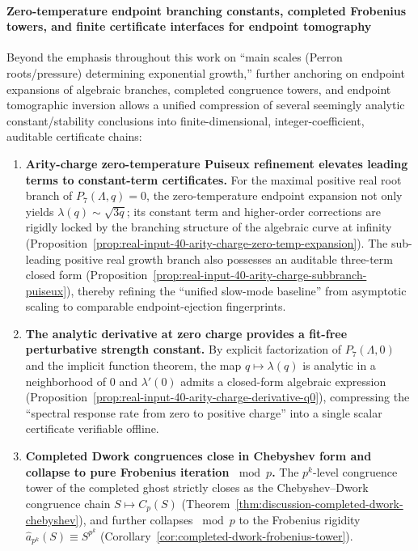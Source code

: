 \paragraph{Zero-temperature endpoint branching constants, completed Frobenius towers, and finite certificate interfaces for endpoint tomography}
Beyond the emphasis throughout this work on ``main scales (Perron roots/pressure) determining exponential growth,'' further anchoring on endpoint expansions of algebraic branches, completed congruence towers, and endpoint tomographic inversion allows a unified compression of several seemingly analytic constant/stability conclusions into finite-dimensional, integer-coefficient, auditable certificate chains:
\begin{enumerate}
  \item \textbf{Arity-charge zero-temperature Puiseux refinement elevates leading terms to constant-term certificates.}
  For the maximal positive real root branch of \(P_7(\Lambda,q)=0\), the zero-temperature endpoint expansion not only yields \(\lambda(q)\sim \sqrt{3q}\); its constant term and higher-order corrections are rigidly locked by the branching structure of the algebraic curve at infinity (Proposition~\ref{prop:real-input-40-arity-charge-zero-temp-expansion}).
  The sub-leading positive real growth branch also possesses an auditable three-term closed form (Proposition~\ref{prop:real-input-40-arity-charge-subbranch-puiseux}), thereby refining the ``unified slow-mode baseline'' from asymptotic scaling to comparable endpoint-ejection fingerprints.

  \item \textbf{The analytic derivative at zero charge provides a fit-free perturbative strength constant.}
  By explicit factorization of \(P_7(\Lambda,0)\) and the implicit function theorem, the map \(q\mapsto\lambda(q)\) is analytic in a neighborhood of \(0\) and \(\lambda'(0)\) admits a closed-form algebraic expression (Proposition~\ref{prop:real-input-40-arity-charge-derivative-q0}), compressing the ``spectral response rate from zero to positive charge'' into a single scalar certificate verifiable offline.

  \item \textbf{Completed Dwork congruences close in Chebyshev form and collapse to pure Frobenius iteration \texorpdfstring{$\bmod p$}{mod p}.}
  The \(p^k\)-level congruence tower of the completed ghost strictly closes as the Chebyshev--Dwork congruence chain \(S\mapsto C_p(S)\) (Theorem~\ref{thm:discussion-completed-dwork-chebyshev}), and further collapses \(\bmod p\) to the Frobenius rigidity \(\widehat a_{p^k}(S)\equiv S^{p^k}\) (Corollary~\ref{cor:completed-dwork-frobenius-tower}).


\end{enumerate}
